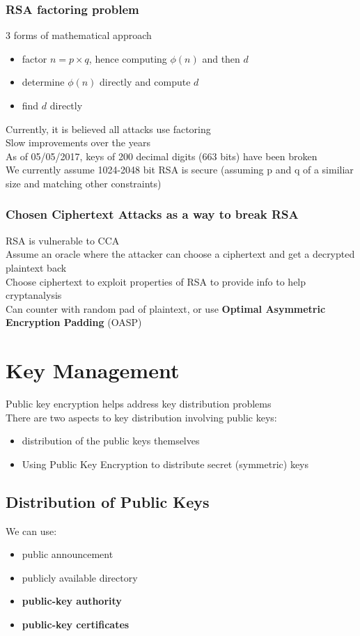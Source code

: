 \documentclass{article}
\begin{document}
\subsubsection{RSA factoring problem}
3 forms of mathematical approach
\begin{itemize}
    \item factor $n=p\times q$, hence computing $\phi(n)$ and then $d$
    \item determine $\phi(n)$ directly and compute $d$
    \item find $d$ directly
\end{itemize}
Currently, it is believed all attacks use factoring
\\Slow improvements over the years
\\As of 05/05/2017, keys of 200 decimal digits (663 bits) have been broken
\\We currently assume 1024-2048 bit RSA is secure (assuming p and q of a similiar size and matching other constraints)
\subsubsection{Chosen Ciphertext Attacks as a way to break RSA}
RSA is vulnerable to CCA
\\Assume an oracle where the attacker can choose a ciphertext and get a decrypted plaintext back
\\Choose ciphertext to exploit properties of RSA to provide info to help cryptanalysis
\\Can counter with random pad of plaintext, or use \textbf{Optimal Asymmetric Encryption Padding} (OASP)
\section{Key Management}
Public key encryption helps address key distribution problems
\\There are two aspects to key distribution involving public keys:
\begin{itemize}
    \item distribution of the public keys themselves
    \item Using Public Key Encryption to distribute secret (symmetric) keys
\end{itemize}
\subsection{Distribution of Public Keys}
We can use:
\begin{itemize}
    \item public announcement
    \item publicly available directory
    \item \textbf{public-key authority}
    \item \textbf{public-key certificates}
\end{itemize}
\end{document}
